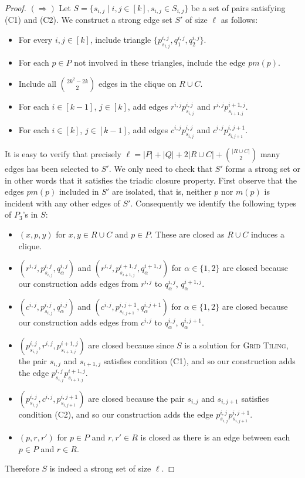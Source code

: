 \begin{proof}
$(\Rightarrow)$ Let $S = \{s_{i,j}\mid i,j\in [k], s_{i,j}\in S_{i,j} \}$ be a set of pairs satisfying (C1) and (C2). We construct a strong edge set $S'$ of size $\ell$ as follows: 
\begin{itemize}
\item For every $i,j\in[k]$, include triangle $\{p_{s_{i,j}}^{i,j}, q_1^{i,j}, q_2^{i,j}\}$.
\item For each $p\in P$ not involved in these triangles, include the edge $pm(p)$.
\item Include all $\binom{2k^2-2k}{2}$ edges in the clique on $R\cup C$.
\item For each $i\in [k-1]$, $j\in [k]$, add edges $r^{i,j}p_{s_{i,j}}^{i,j}$ and $r^{i,j}p_{s_{i+1,j}}^{i+1,j}$.
\item For each $i\in [k]$, $j\in [k-1]$, add edges $c^{i,j}p_{s_{i,j}}^{i,j}$ and $c^{i,j}p_{s_{i,j+1}}^{i,j+1}$.
\end{itemize}
It is easy to verify that precisely $\ell = |P|+ |Q| + 2|R\cup C| + \binom{|R\cup C|}{2}$ many edges has been selected to $S'$. We only need to check that $S'$ forms a strong set or in other words that it satisfies the triadic closure property. First observe that the edges $pm(p)$ included in $S'$ are isolated, that is, neither $p$ nor $m(p)$ is incident with any other edges of $S'$. Consequently we identify the following types of $P_3$'s in $S$: 
\begin{itemize}
\item 
$(x,p,y)$ for $x,y\in R\cup C$ and $p\in P$. These are closed as $R\cup C$ induces a clique.
\item $(r^{i,j}, p_{s_{i,j}}^{i,j}, q^{i,j}_{\alpha})$ and $(r^{i,j}, p_{s_{i+1,j}}^{i+1,j}, q^{i+1,j}_{\alpha})$ for $\alpha\in \{1,2\}$ are closed because our construction adds edges from $r^{i,j}$ to  $q_{\alpha}^{i,j}$, $q_{\alpha}^{i+1,j}$.
\item 
$(c^{i,j}, p_{s_{i,j}}^{i,j}, q^{i,j}_{\alpha})$ and $(c^{i,j}, p_{s_{i,j+1}}^{i,j+1}, q^{i,j+1}_{\alpha})$ for $\alpha\in \{1,2\}$ are closed because our construction adds edges from $c^{i,j}$ to  $q_{\alpha}^{i,j}$, $q_{\alpha}^{i,j+1}$.
\item  
$(p_{s_{i,j}}^{i,j},r^{i,j}, p_{s_{i+1,j}}^{i+1,j})$ are closed because since $S$ is a solution for \textsc{Grid Tiling}, the pair $s_{i,j}$ and $s_{i+1,j}$ satisfies condition (C1), and so our construction adds the edge $p_{s_{i,j}}^{i,j}p_{s_{i+1,j}}^{i+1,j}$.
\item 
$(p_{s_{i,j}}^{i,j},c^{i,j}, p_{s_{i,j+1}}^{i,j+1})$ are closed because the pair $s_{i,j}$ and $s_{i,j+1}$ satisfies condition (C2), and so our construction adds the edge $p_{s_{i,j}}^{i,j}p_{s_{i,j+1}}^{i,j+1}$.
\item
  $(p, r, r')$ for $p \in P$ and $r, r' \in R$ is closed as there is an edge between each $p \in P$ and $r \in R$.
\end{itemize}
Therefore $S$ is indeed a strong set of size $\ell$.  


\end{proof}
